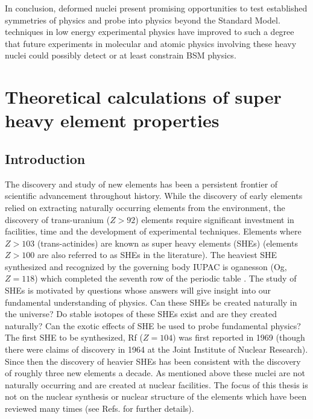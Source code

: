 \documentclass[10pt,a4paper, twoside, openright]{report}
\begin{document}
\linebreak
In conclusion, deformed nuclei present promising opportunities to test established symmetries of physics and probe into physics beyond the Standard Model. techniques in low energy experimental physics have improved to such a degree that future experiments in molecular and atomic physics involving these heavy nuclei could possibly detect or at least constrain BSM physics.
\part{Theoretical calculations of super heavy element properties}
\chapter{Introduction} \label{chap:P2Intro}
The discovery and study of new elements has been a persistent frontier of scientific advancement throughout history. While the discovery of early elements relied on extracting naturally occurring elements from the environment, the discovery of trans-uranium ($Z>92$) elements require significant investment in facilities, time and the development of experimental techniques. Elements where $Z>103$ (trans-actinides) are known as super heavy elements (SHEs) (elements $Z>100$ are also referred to as SHEs in the literature). The heaviest SHE synthesized and recognized by the governing body IUPAC is oganesson (Og, $Z=118$) which completed the seventh row of the periodic table \cite{Karol2016}. The study of SHEs is motivated by questions whose answers will give insight into our fundamental understanding of physics. Can these SHEs be created naturally in the universe? Do stable isotopes of these SHEs exist and are they created naturally? Can the exotic effects of SHE be used to probe fundamental physics?  \\
\linebreak
The first SHE to be synthesized, Rf ($Z=104$) was first reported in 1969 \cite{Ghoirso1974} (though there were claims of discovery in 1964 at the Joint Institute of Nuclear Research). Since then the discovery of heavier SHEs has been consistent with the discovery of roughly three new elements a decade. As mentioned above these nuclei are not naturally occurring and are created at nuclear facilities. The focus of this thesis is not on the nuclear synthesis or nuclear structure of the elements which have been reviewed many times (see Refs. \cite{HHO2013, Nilsson1969SHE, Giuliani2019, Nix1972, Cwiok2005, Hofmann2015, Oganessian2015, Oganessian2017, Nazarewicz2018} for further details). \\
\end{document}
